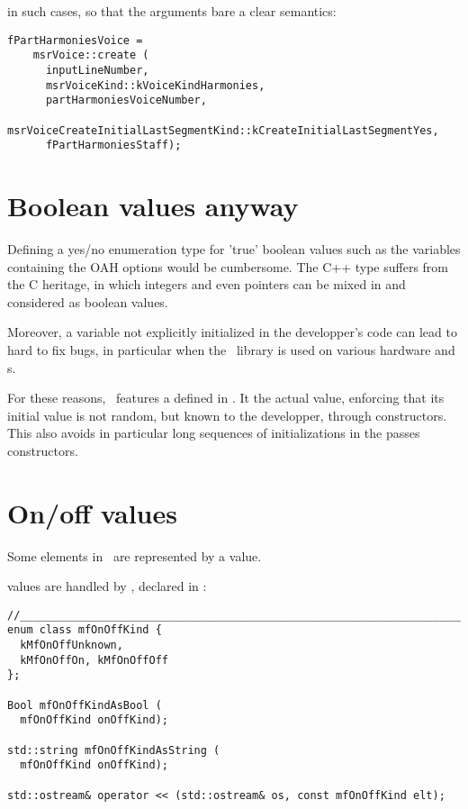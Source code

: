 in such cases, so that the arguments bare a clear semantics:
\begin{lstlisting}[language=CPlusPlus]
  fPartHarmoniesVoice =
    msrVoice::create (
      inputLineNumber,
      msrVoiceKind::kVoiceKindHarmonies,
      partHarmoniesVoiceNumber,
      msrVoiceCreateInitialLastSegmentKind::kCreateInitialLastSegmentYes,
      fPartHarmoniesStaff);
\end{lstlisting}


\section{Boolean values anyway}

Defining a yes/no enumeration type for 'true' boolean values such as the variables containing the OAH options would be cumbersome. The C++  type suffers from the C heritage, in which integers and even pointers can be mixed in and considered as boolean values.

Moreover, a  variable not explicitly initialized in the developper's code can lead to hard to fix bugs, in particular when the \mf\ library is used on various hardware and \OS s.

For these reasons, \mf\ features a  defined in . It  the actual  value, enforcing that its initial value is not random, but known to the developper, through constructors. This also avoids in particular long sequences of initializations in the passes constructors.


\section{On/off values}

Some elements in \mf\ are represented by a  value.

\OnOff values are handled by , declared in :
\begin{lstlisting}[language=Terminal]
//______________________________________________________________________________
enum class mfOnOffKind {
  kMfOnOffUnknown,
  kMfOnOffOn, kMfOnOffOff
};

Bool mfOnOffKindAsBool (
  mfOnOffKind onOffKind);

std::string mfOnOffKindAsString (
  mfOnOffKind onOffKind);

std::ostream& operator << (std::ostream& os, const mfOnOffKind elt);
\end{lstlisting}

